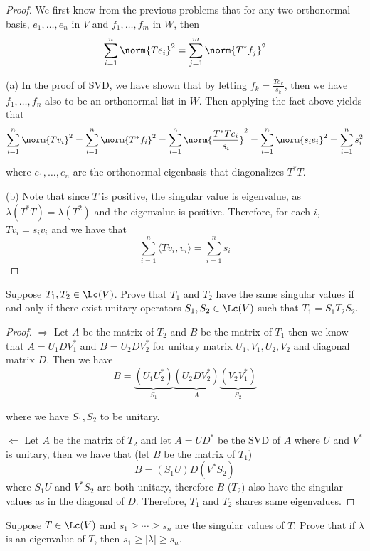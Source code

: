 \documentclass{extarticle}
\begin{document}
\begin{proof}
We first know from the previous problems that for any two orthonormal basis, \(e_1, \ldots, e_n\)
in \(V\) and \(f_1, \ldots, f_m\) in \(W\), then
\[\sum_{i=1}^{n} \norm{Te_i}^2 = \sum_{j=1}^{m} \norm{T^* f_j}^2\]

(a) In the proof of SVD, we have shown that by letting \(f_k = \frac{Te_k}{s_k}\), then we have
\(f_1, \ldots, f_n\) also to be an orthonormal list in \(W\). Then applying the fact above yields
that
\[\sum_{i=1}^{n} \norm{T v_i}^2 = \sum_{i=1}^{n} \norm{T^*f_i}^2 =
\sum_{i=1}^{n} \norm{ \frac{T^*T e_i}{s_i}}^2 = \sum_{i=1}^{n} \norm{s_i e_i}^2 = \sum_{i=1}^{n} s_i^2\]

where \(e_1, \ldots, e_n\) are the orthonormal eigenbasis that diagonalizes \(T^*T\).

(b) Note that since \(T\) is positive, the singular value is eigenvalue, as \(\lambda(T^*T)
= \lambda(T^2)\) and the eigenvalue is positive. Therefore, for each \(i\), \(T v_i = s_i v_i\)
and we have that
\[\sum_{i=1}^{n} \langle Tv_i,v_i \rangle = \sum_{i=1}^{n} s_i\]
\end{proof}

\begin{problem}{13}
    Suppose \(T_1, T_2 \in \Lc(V)\). Prove that \(T_1\) and \(T_2\) have the same singular values
    if and only if there exist unitary operators \(S_1, S_2 \in \Lc(V)\) such that \(T_1
    = S_1 T_2 S_2\).
\end{problem}

\begin{proof}
\(\Rightarrow\) Let \(A\) be the matrix of \(T_2\) and \(B\) be the matrix of \(T_1\) then we know that
\(A = U_1 D V_1^*\) and \(B = U_2 D V_2^*\) for unitary matrix \(U_1, V_1, U_2, V_2\) and
diagonal matrix \(D\). Then we have
\[B = \underbrace{(U_1 U_2^*)}_{S_1} \underbrace{(U_2 D V_2^*)}_A \underbrace{(V_2 V_1^*)}_{S_2} \]

where we have \(S_1, S_2\) to be unitary.

\(\Leftarrow\) Let \(A\) be the matrix of \(T_2\) and let \(A = UD^*\) be the SVD of \(A\) where
\(U\) and \(V^*\) is unitary, then we have that (let \(B\) be the matrix of \(T_1\))
\[B = (S_1 U)D(V^*S_2)\]
where \(S_1 U\) and \(V^*S_2\) are both unitary, therefore \(B\) (\(T_2\)) also have the singular values
as in the diagonal of \(D\). Therefore, \(T_1\) and \(T_2\) shares same eigenvalues.
\end{proof}

\begin{problem}{15}
    Suppose \(T \in \Lc(V)\) and \(s_1 \geq \cdots \geq s_n\) are the singular values of \(T\).
    Prove that if \(\lambda\) is an eigenvalue of \(T\), then \(s_1 \geq |\lambda| \geq s_n\).
\end{problem}
\end{document}
